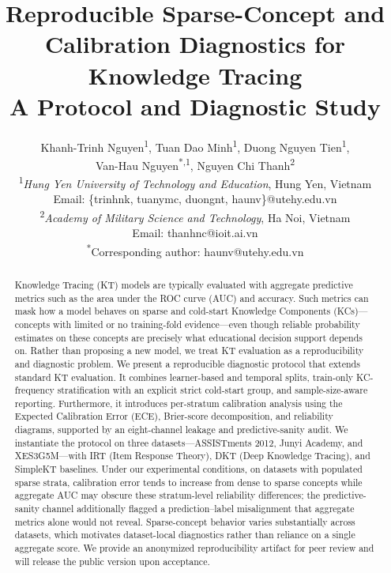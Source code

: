 \documentclass[12pt,a4paper]{jedm}
\begin{document}
\title{\sffamily\bfseries Reproducible Sparse-Concept and Calibration Diagnostics for Knowledge Tracing\\
{\large A Protocol and Diagnostic Study}}

\author{
\sffamily Khanh-Trinh Nguyen\textsuperscript{1}, Tuan Dao Minh\textsuperscript{1}, Duong Nguyen Tien\textsuperscript{1}, \\
\sffamily Van-Hau Nguyen\textsuperscript{*,1}, Nguyen Chi Thanh\textsuperscript{2}\\[8pt]
\normalsize \textsuperscript{1}\textit{Hung Yen University of Technology and Education}, Hung Yen, Vietnam\\
\normalsize Email: \{trinhnk, tuanymc, duongnt, haunv\}@utehy.edu.vn\\[4pt]
\normalsize \textsuperscript{2}\textit{Academy of Military Science and Technology}, Ha Noi, Vietnam\\
\normalsize Email: thanhnc@ioit.ai.vn\\[8pt]
\normalsize \textsuperscript{*}Corresponding author: haunv@utehy.edu.vn
}
\date{}

\maketitle

\begin{abstract}
Knowledge Tracing (KT) models are typically evaluated with aggregate predictive metrics such as the area under the ROC curve (AUC) and accuracy. Such metrics can mask how a model behaves on sparse and cold-start Knowledge Components (KCs)---concepts with limited or no training-fold evidence---even though reliable probability estimates on these concepts are precisely what educational decision support depends on. Rather than proposing a new model, we treat KT evaluation as a reproducibility and diagnostic problem. We present a reproducible diagnostic protocol that extends standard KT evaluation. It combines learner-based and temporal splits, train-only KC-frequency stratification with an explicit strict cold-start group, and sample-size-aware reporting. Furthermore, it introduces per-stratum calibration analysis using the Expected Calibration Error (ECE), Brier-score decomposition, and reliability diagrams, supported by an eight-channel leakage and predictive-sanity audit. We instantiate the protocol on three datasets---ASSISTments 2012, Junyi Academy, and XES3G5M---with IRT (Item Response Theory), DKT (Deep Knowledge Tracing), and SimpleKT baselines. Under our experimental conditions, on datasets with populated sparse strata, calibration error tends to increase from dense to sparse concepts while aggregate AUC may obscure these stratum-level reliability differences; the predictive-sanity channel additionally flagged a prediction--label misalignment that aggregate metrics alone would not reveal. Sparse-concept behavior varies substantially across datasets, which motivates dataset-local diagnostics rather than reliance on a single aggregate score. We provide an anonymized reproducibility artifact for peer review and will release the public version upon acceptance.
\end{abstract}
\end{document}
